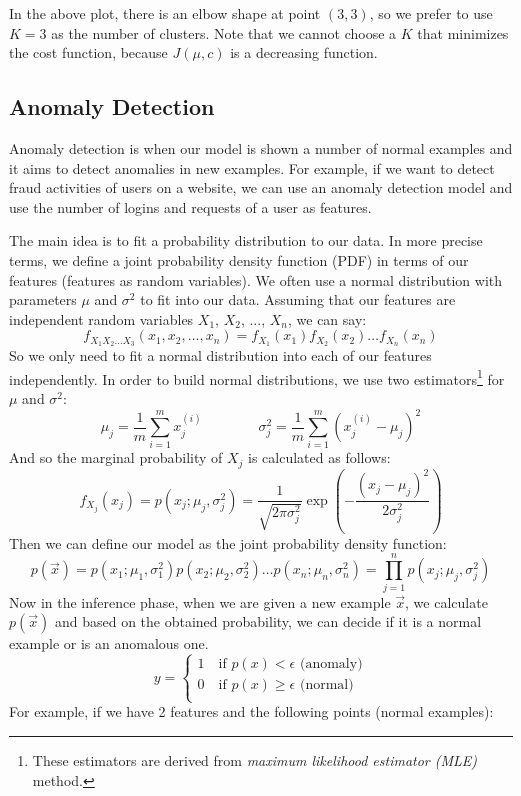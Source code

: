 \documentclass[a4paper, 12pt]{book}
\begin{document}
In the above plot, there is an elbow shape at point $(3,3)$, so we prefer to use $K=3$ as the number of clusters. Note that we cannot choose a $K$ that minimizes the cost function, because $J(\mu,c)$ is a decreasing function.
\newpage

\subsection{Anomaly Detection}

Anomaly detection is when our model is shown a number of normal examples and it aims to detect anomalies in new examples. For example, if we want to detect fraud activities of users on a website, we can use an anomaly detection model and use the number of logins and requests of a user as features.

The main idea is to fit a probability distribution to our data. In more precise terms, we define a joint probability density function (PDF) in terms of our features (features as random variables). We often use a normal distribution with parameters $\mu$ and $\sigma^2$ to fit into our data. Assuming that our features are independent random variables $X_1$, $X_2$, ..., $X_n$, we can say:
\[f_{X_1 X_2 \dots X_3}(x_1, x_2, \dots, x_n) = f_{X_1}(x_1) f_{X_2}(x_2) \dots f_{X_n}(x_n)\]
So we only need to fit a normal distribution into each of our features independently. In order to build normal distributions, we use two estimators\footnote{These estimators are derived from \emph{maximum likelihood estimator (MLE)} method.} for $\mu$ and $\sigma^2$:
\[\mu_j = \frac{1}{m} \sum_{i=1}^m x_j^{(i)} \qquad \qquad \sigma_j^2 = \frac{1}{m} \sum_{i=1}^m (x_j^{(i)} - \mu_j)^2 \]
And so the marginal probability of $X_j$ is calculated as follows:
\[f_{X_j}(x_j) = p(x_j;\mu_j,\sigma_j^2) = \frac{1}{\sqrt{2\pi\sigma_j^2}} \exp\left(-\frac{(x_j - \mu_j)^2}{2\sigma_j^2}\right)\]
Then we can define our model as the joint probability density function:
\[p(\Vec{x}) = p(x_1;\mu_1,\sigma_1^2) p(x_2;\mu_2,\sigma_2^2) \dots p(x_n;\mu_n,\sigma_n^2) = \prod_{j=1}^np(x_j;\mu_j,\sigma_j^2)\]
Now in the inference phase, when we are given a new example $\Vec{x}$, we calculate $p(\Vec{x})$ and based on the obtained probability, we can decide if it is a normal example or is an anomalous one.
\[y = \begin{cases}
    1 \quad \text{if } p(x) < \epsilon \text{ (anomaly)} \\
    0 \quad \text{if } p(x) \geq \epsilon \text{ (normal)} \\
\end{cases}\]
For example, if we have 2 features and the following points (normal examples):
\end{document}
